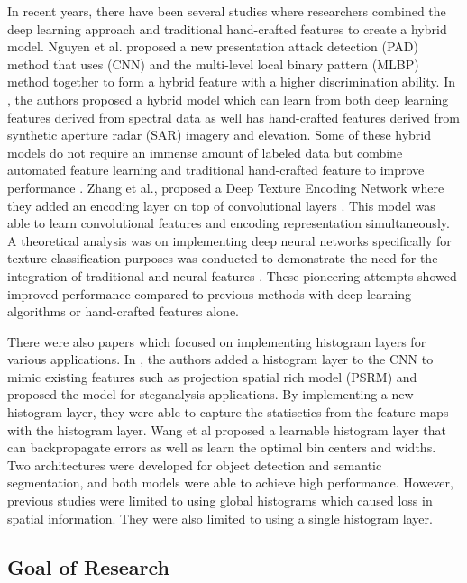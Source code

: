 \documentclass[10pt,twocolumn,letterpaper]{article}
\begin{document}
In recent years, there have been several studies where researchers combined the deep learning approach and traditional hand-crafted features to create a hybrid model. 
Nguyen et al. \cite{Nguyen2018Face} proposed a new presentation attack detection (PAD) method that uses (CNN)  and the multi-level local binary pattern (MLBP) method together to form a hybrid feature with a higher discrimination ability. In \cite{Nijhawan2019snowmap}, the authors proposed a hybrid model which can learn from both deep learning features derived from spectral data as well has hand-crafted features derived from synthetic aperture radar (SAR) imagery and elevation. Some of these hybrid models do not require an immense amount of labeled data but combine automated feature learning and traditional hand-crafted feature to improve performance \cite{Nijhawan2019snowmap}. 
Zhang et al., proposed a Deep Texture Encoding Network where they added an encoding layer on top of convolutional layers \cite{Zhang2016ten}. This model was able to learn convolutional features and encoding representation simultaneously. A theoretical analysis was on implementing deep neural networks specifically for texture classification purposes was conducted to demonstrate the need for the integration of traditional and neural features \cite{Basu2018deeptexture}. These pioneering attempts showed improved performance compared to previous methods with deep learning algorithms or hand-crafted features alone. 

There were also papers which focused on implementing histogram layers for various applications. 
In \cite{Sedighi2017steg}, the authors added a histogram layer to the CNN to mimic existing features such as projection spatial rich model (PSRM) and proposed the model for steganalysis applications. By implementing a new histogram layer, they were able to capture the statisctics from the feature maps with the histogram layer. Wang et al \cite{Wang2018learnable} proposed a learnable histogram layer that can backpropagate errors as well as learn the optimal bin centers and widths. Two architectures were developed for object detection and semantic segmentation, and both models were able to achieve high performance.
However, previous studies were limited to using global histograms which caused loss in spatial information. They were also limited to using a single histogram layer.

\subsection{Goal of Research}
\end{document}
